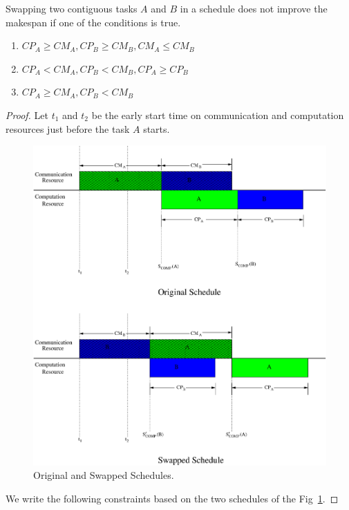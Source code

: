 \documentclass[sigconf]{acmart}
\begin{document}
	\begin{lemma}\label{lemma:swappingOfTasks}
		Swapping two contiguous tasks $A$ and $B$ in a schedule does not improve the makespan if one of the conditions is true.
		\begin{enumerate}[label=\roman*)]
			\item  $CP_A \ge CM_A, CP_B \ge CM_B, CM_A \le CM_B$
			\item $CP_A < CM_A, CP_B < CM_B, CP_A \ge CP_B$
			\item $CP_A \ge CM_A, CP_B < CM_B$
		\end{enumerate}
	\end{lemma}
	\begin{proof}
		Let $t_1$ and $t_2$ be the early start time on communication and computation resources just before the task $A$ starts.
		
		\begin{figure}[htb]
			\centering
			\includegraphics[scale=0.35]{Figs/original_swapped_schedules}
			\caption{ \label{fig:bothSchedule} Original and Swapped Schedules.}
		\end{figure}
		We write the following constraints based on the two schedules of the Fig~\ref{fig:bothSchedule}.
		

\end{proof}
\end{document}
